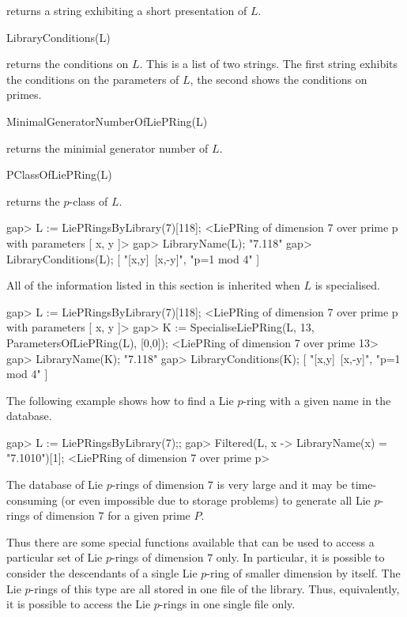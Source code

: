 returns a string exhibiting a short presentation of $L$.

\> LibraryConditions(L)

returns the conditions on $L$. This is a list of two strings. The first
string exhibits the conditions on the parameters of $L$, the second shows
the conditions on primes.

\> MinimalGeneratorNumberOfLiePRing(L)

returns the minimial generator number of $L$.

\> PClassOfLiePRing(L)

returns the $p$-class of $L$.

\beginexample
gap> L := LiePRingsByLibrary(7)[118];
<LiePRing of dimension 7 over prime p with parameters [ x, y ]>
gap> LibraryName(L);
"7.118"
gap> LibraryConditions(L);
[ "[x,y]~[x,-y]", "p=1 mod 4" ]
\endexample

All of the information listed in this section is inherited when $L$
is specialised.

\beginexample
gap> L := LiePRingsByLibrary(7)[118];
<LiePRing of dimension 7 over prime p with parameters [ x, y ]>
gap> K := SpecialiseLiePRing(L, 13, ParametersOfLiePRing(L), [0,0]);
<LiePRing of dimension 7 over prime 13>
gap> LibraryName(K);
"7.118"
gap> LibraryConditions(K);
[ "[x,y]~[x,-y]", "p=1 mod 4" ]
\endexample

The following example shows how to find a Lie $p$-ring with a 
given name in the database.

\beginexample
gap> L := LiePRingsByLibrary(7);;
gap> Filtered(L, x -> LibraryName(x) = "7.1010")[1];
<LiePRing of dimension 7 over prime p> 
\endexample


The database of Lie $p$-rings of dimension $7$ is very large and it may
be time-consuming (or even impossible due to storage problems) to generate
all Lie $p$-rings of dimension $7$ for a given prime $P$. 

Thus there are some special functions available that can be used to access
a particular set of Lie $p$-rings of dimension $7$ only. In particular, it
is possible to consider the descendants of a single Lie $p$-ring of smaller
dimension by itself. The Lie $p$-rings of this type are all stored in one
file of the library. Thus, equivalently, it is possible to access the Lie
$p$-rings in one single file only.


